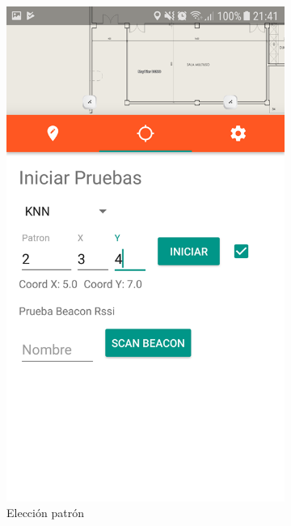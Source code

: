 \begin{figure}[ht!]
\begin{subfigure}{.3\textwidth}
  \includegraphics[width=.8\linewidth]{figures/fase_online2.png}
  \caption{Elección patrón}
  \label{fig:online2}
\end{subfigure}
\begin{subfigure}{.3\textwidth}
  \centering

\end{subfigure}
\end{figure}
